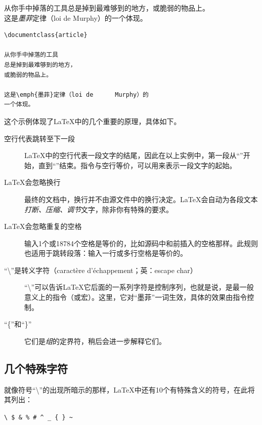 \begin{codelist}[1.1]{
    从你手中掉落的工具总是掉到最难够到的地方，或脆弱的物品上。\\
    这是\emph{墨菲}定律（loi de Murphy）的一个体现。
}
\begin{verbatim}
\documentclass{article}

从你手中掉落的工具
总是掉到最难够到的地方，
或脆弱的物品上。

这是\emph{墨菲}定律（loi de      Murphy）的
一个体现。
\end{verbatim}
\end{codelist}

这个示例体现了\LaTeX 中的几个重要的原理，具体如下。

\begin{description}


\item[空行代表跳转至下一段] \LaTeX 中的空行代表一段文字的结尾，因此在以上实例中，第一段从“”开始，直到“”结束。指令与空行等价，可以用来表示一段文字的起始。

\item[\LaTeX 会忽略换行]最终的文档中，换行并不由源文件中的换行决定。\LaTeX 会自动为各段文本\textit{打断、压缩、调节}文字，除非你有特殊的要求。

\item[\LaTeX 会忽略重复的空格]输入1个或18784个空格是等价的，比如源码中和前插入的空格那样。此规则也适用于跳转段落：输入一行或多行空格是等价的。

\item[“\backslash ”是转义字符（caractère d’échappement；英：escape char）]“\backslash ”可以告诉\LaTeX 它后面的一系列字符是控制序列，也就是说，是最一般意义上的指令（或宏）。这里，它对“墨菲”一词生效，具体的效果由指令控制。

\item[“\{”和“\}”]它们是\textit{组}的定界符，稍后会进一步解释它们。

\end{description}

\subsection{几个特殊字符}

就像符号“\backslash”的出现所暗示的那样，\LaTeX 中还有10个有特殊含义的符号，在此将其列出：

\begin{dmd}
    \verb+\ $ & % # ^ _ { } ~+
\end{dmd}

